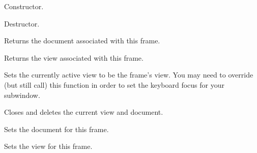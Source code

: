 Constructor.

\label{wxdocchildframedtor}


Destructor.

\label{wxdocchildframegetdocument}


Returns the document associated with this frame.

\label{wxdocchildframegetview}


Returns the view associated with this frame.

\label{wxdocchildframeonactivate}


Sets the currently active view to be the frame's view. You may need
to override (but still call) this function in order to set the keyboard
focus for your subwindow.

\label{wxdocchildframeonclosewindow}


Closes and deletes the current view and document.

\label{wxdocchildframesetdocument}


Sets the document for this frame.

\label{wxdocchildframesetview}


Sets the view for this frame.


